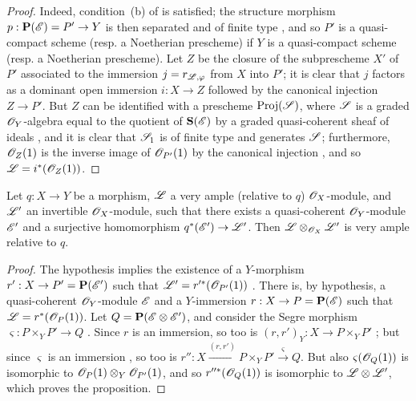 \begin{proof}
Indeed, condition~(b) of  is satisfied;
the structure morphism $p:\bb{P}(\sh{E})=P'\to Y$ is then separated and of finite type , and so $P'$ is a quasi-compact scheme (resp. a Noetherian prescheme) if $Y$ is a quasi-compact scheme (resp. a Noetherian prescheme).
Let $Z$ be the closure  of the subprescheme $X'$ of $P'$ associated to the immersion $j=r_{\mathscr{L},\varphi}$ from $X$ into $P'$;
it is clear that $j$ factors as a dominant open immersion $i:X\to Z$ followed by the canonical injection $Z\to P'$.
But $Z$ can be identified with a prescheme $\operatorname{Proj}(\mathscr{S})$, where $\mathscr{S}$ is a graded $\mathscr{O}_Y$-algebra equal to the quotient of $\mathbf{S}(\mathscr{E})$ by a graded quasi-coherent sheaf of ideals , and it is clear that $\mathscr{S}_1$ is of finite type and generates $\mathscr{S}$;
furthermore, $\mathscr{O}_Z(1)$ is the inverse image of $\mathscr{O}_{P'}(1)$ by the canonical injection , and so $\mathscr{L}=i^*(\mathscr{O}_Z(1))$.
\end{proof}

\begin{proposition}[4.4.8]
\label{II.4.4.8}
Let $q:X\to Y$ be a morphism, $\mathscr{L}$ a very ample (relative to $q$) $\mathscr{O}_X$-module, and $\mathscr{L}'$ an invertible $\mathscr{O}_X$-module, such that there exists a quasi-coherent $\mathscr{O}_Y$-module $\mathscr{E}'$ and a surjective homomorphism $q^*(\sh{E}')\to\sh{L}'$.
Then $\mathscr{L}\otimes_{\mathscr{O}_X}\mathscr{L}'$ is very ample relative to $q$.
\end{proposition}

\begin{proof}
The hypothesis implies the existence of a $Y$-morphism $r':X\to P'=\bb{P}(\sh{E}')$ such that $\mathscr{L}'=r'^*(\mathscr{O}_{P'}(1))$ .
There is, by hypothesis, a quasi-coherent $\mathscr{O}_Y$-module $\mathscr{E}$ and a
$Y$-immersion $r:X\to P=\bb{P}(\sh{E})$ such that $\mathscr{L}=r^*(\mathscr{O}_P(1))$.
Let $Q=\mathbf{P}(\mathscr{E}\otimes\mathscr{E}')$, and consider the Segre morphism $\varsigma:P\times_Y P'\to Q$ .
Since $r$ is an immersion, so too is $(r,r')_Y:X\to P\times_Y P'$ ;
but since $\varsigma$ is an immersion , so too is $r'':X\xrightarrow{(r,r')}P\times_Y P'\xrightarrow{\varsigma}Q$.
But also  $\varsigma(\mathscr{O}_Q(1))$ is isomorphic to $\mathscr{O}_P(1)\otimes_Y\mathscr{O}_{P'}(1)$, and so  $r''^*(\mathscr{O}_Q(1))$ is isomorphic to $\mathscr{L}\otimes\mathscr{L}'$, which proves the proposition.
\end{proof}


